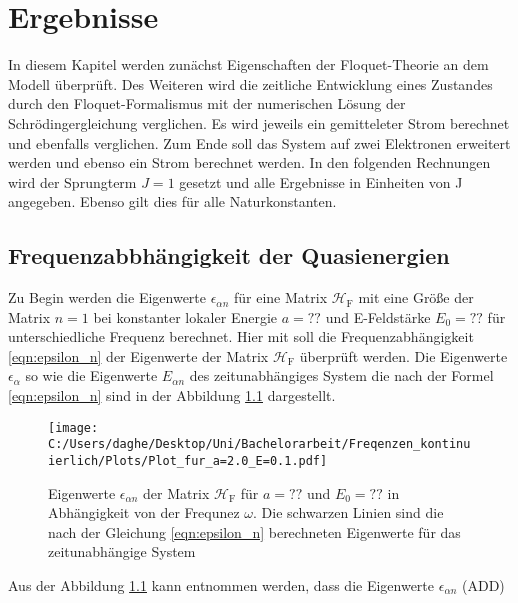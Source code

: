 \chapter{Ergebnisse}
In diesem Kapitel werden zunächst
Eigenschaften der Floquet-Theorie an dem Modell überprüft.
Des Weiteren wird die zeitliche Entwicklung
eines Zustandes durch den
Floquet-Formalismus mit der numerischen Lösung der
Schrödingergleichung verglichen. Es wird jeweils ein gemitteleter Strom berechnet und
ebenfalls verglichen.
Zum Ende soll das System auf zwei Elektronen erweitert werden und ebenso ein Strom berechnet werden.
In den folgenden Rechnungen wird der Sprungterm $J=1$ gesetzt und  alle Ergebnisse in Einheiten von J angegeben.
Ebenso gilt dies für alle Naturkonstanten.

\section{Frequenzabbhängigkeit der Quasienergien}
Zu Begin werden die Eigenwerte $\epsilon_{\alpha n}$ für eine Matrix $\mathcal{H}_\mathrm{F}$ mit eine Größe der Matrix $n=1$
bei konstanter lokaler Energie $a=??$ und E-Feldstärke $E_0=??$ für unterschiedliche Frequenz berechnet.
Hier mit soll die Frequenzabhängigkeit \eqref{eqn:epsilon_n} der Eigenwerte der Matrix $\mathcal{H}_\mathrm{F}$
überprüft werden.
Die Eigenwerte $\epsilon_\alpha$ so wie die Eigenwerte $E_{\alpha n}$ des zeitunabhängiges System
die nach der Formel \eqref{eqn:epsilon_n}
sind in der Abbildung \ref{fig:epsilon_f} dargestellt.
\begin{figure}
   \centering
   \texttt{[image: C:/Users/daghe/Desktop/Uni/Bachelorarbeit/Freqenzen\_kontinuierlich/Plots/Plot\_fur\_a=2.0\_E=0.1.pdf]}
   \caption{Eigenwerte $\epsilon_{\alpha n}$ der Matrix $\mathcal{H}_\mathrm{F}$ für $a=??$ und $E_0=??$ in Abhängigkeit von der Frequnez $\omega$.
    Die schwarzen Linien sind die nach der Gleichung \eqref{eqn:epsilon_n} berechneten Eigenwerte für das zeitunabhängige System}
   \label{fig:epsilon_f}
\end{figure}
Aus der Abbildung \ref{fig:epsilon_f} kann entnommen werden, dass die Eigenwerte $\epsilon_{\alpha n}$
(ADD)
